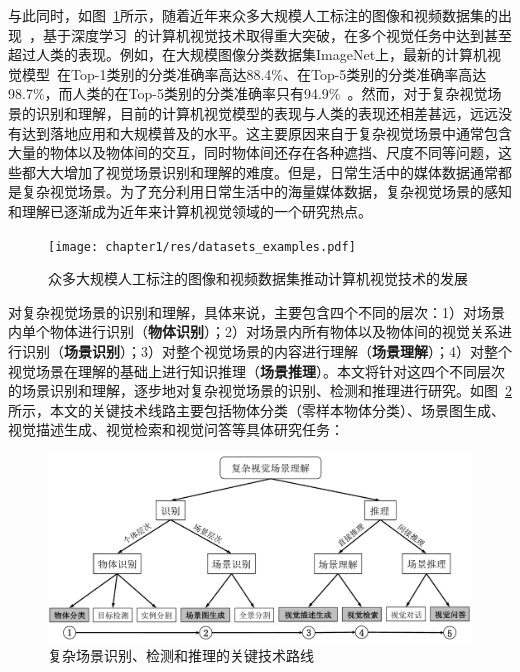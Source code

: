 与此同时，如图~\ref{ch1:fig:datasets_examples}所示，随着近年来众多大规模人工标注的图像和视频数据集的出现~\cite{lin2014microsoft,russakovsky2015imagenet,krishna2017visual,karpathy2014large,miech2019howto100m}，基于深度学习~\cite{lecun2015deep,krizhevsky2012imagenet}的计算机视觉技术取得重大突破，在多个视觉任务中达到甚至超过人类的表现。例如，在大规模图像分类数据集ImageNet上，最新的计算机视觉模型~\cite{xie2019self}在Top-1类别的分类准确率高达88.4\%、在Top-5类别的分类准确率高达98.7\%，而人类的在Top-5类别的分类准确率只有94.9\%~\cite{russakovsky2015imagenet}。然而，对于复杂视觉场景的识别和理解，目前的计算机视觉模型的表现与人类的表现还相差甚远，远远没有达到落地应用和大规模普及的水平。这主要原因来自于复杂视觉场景中通常包含大量的物体以及物体间的交互，同时物体间还存在各种遮挡、尺度不同等问题，这些都大大增加了视觉场景识别和理解的难度。但是，日常生活中的媒体数据通常都是复杂视觉场景。为了充分利用日常生活中的海量媒体数据，复杂视觉场景的感知和理解已逐渐成为近年来计算机视觉领域的一个研究热点。

\begin{figure}[t]
    \centering
        \texttt{[image: chapter1/res/datasets\_examples.pdf]}
    \caption{众多大规模人工标注的图像和视频数据集推动计算机视觉技术的发展}
    \label{ch1:fig:datasets_examples}
\end{figure}

对复杂视觉场景的识别和理解，具体来说，主要包含四个不同的层次：1）对场景内单个物体进行识别（\textbf{物体识别}）；2）对场景内所有物体以及物体间的视觉关系进行识别（\textbf{场景识别}）；3）对整个视觉场景的内容进行理解（\textbf{场景理解}）；4）对整个视觉场景在理解的基础上进行知识推理（\textbf{场景推理}）。本文将针对这四个不同层次的场景识别和理解，逐步地对复杂视觉场景的识别、检测和推理进行研究。如图~\ref{ch1:fig:scene_understanding}所示，本文的关键技术线路主要包括物体分类（零样本物体分类）、场景图生成、视觉描述生成、视觉检索和视觉问答等具体研究任务：

\begin{figure}[t]
    \centering
        \includegraphics[width=0.95\linewidth]{chapter1/res/scene_understanding.pdf}
    \centering
    \caption{复杂场景识别、检测和推理的关键技术路线}
    \label{ch1:fig:scene_understanding}
\end{figure}

